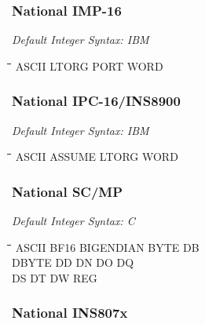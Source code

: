 \subsubsection{National IMP-16}

{\em Default Integer Syntax: IBM}

{\tt\begin{tabbing}
\hspace{3cm}\=\hspace{3cm}\=\hspace{3cm}\=\hspace{3cm}\=\kill
ASCII      \> LTORG       \> PORT        \> WORD \\
\end{tabbing}}

\subsubsection{National IPC-16/INS8900}

{\em Default Integer Syntax: IBM}

{\tt\begin{tabbing}
\hspace{3cm}\=\hspace{3cm}\=\hspace{3cm}\=\hspace{3cm}\=\kill
ASCII      \> ASSUME      \> LTORG       \> WORD \\
\end{tabbing}}

\subsubsection{National SC/MP}

{\em Default Integer Syntax: C}

{\tt\begin{tabbing}
\hspace{3cm}\=\hspace{3cm}\=\hspace{3cm}\=\hspace{3cm}\=\kill
ASCII      \> BF16       \> BIGENDIAN   \> BYTE        \> DB \\
DBYTE      \> DD         \> DN          \> DO          \> DQ \\
DS         \> DT         \> DW          \> REG \\
\end{tabbing}}
	
\subsubsection{National INS807x}

